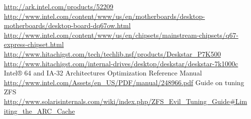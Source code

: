 {}
{}
\begin{thebibliography}{99}
 \url{http://ark.intel.com/products/52209}
 \url{http://www.intel.com/content/www/us/en/motherboards/desktop-motherboards/desktop-board-dq67ow.html}
 \url{http://www.intel.com/content/www/us/en/chipsets/mainstream-chipsets/q67-express-chipset.html}
 \url{http://www.hitachigst.com/tech/techlib.nsf/products/Deskstar_P7K500}
 \url{http://www.hitachigst.com/internal-drives/desktop/deskstar/deskstar-7k1000c}
 Intel® 64 and IA-32 Architectures Optimization Reference Manual \url{http://www.intel.com/Assets/en_US/PDF/manual/248966.pdf}
 Guide on tuning ZFS
\url{http://www.solarisinternals.com/wiki/index.php/ZFS\_Evil\_Tuning\_Guide#Limiting\_the\_ARC\_Cache}
\end{thebibliography}
